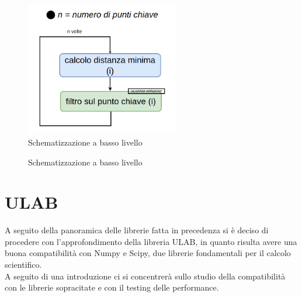 \documentclass[12pt,a4paper]{report}
\begin{document}
\begin{figure}[h]
    \centering
    \includegraphics[width=0.6\textwidth]{img/sliding_window_high.png}
    \caption{Schematizzazione a basso livello }
\end{figure}

\begin{figure}[h]
    \centering
    \caption{Schematizzazione a basso livello }
\end{figure}





\chapter{ULAB}\label{ulab}

A seguito della panoramica delle librerie fatta in precedenza si è
deciso di procedere con l'approfondimento della libreria
ULAB, in quanto risulta avere una buona compatibilità con Numpy e Scipy,
due librerie fondamentali per il calcolo scientifico.\\
A seguito di una introduzione ci si concentrerà sullo studio della
compatibilità con le librerie sopracitate e con il testing delle
performance.
\end{document}
